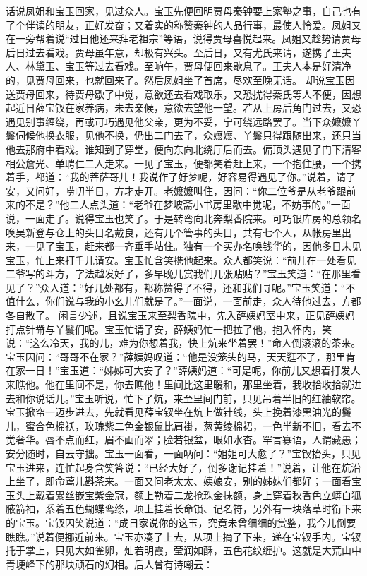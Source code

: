 \documentclass[12pt,oneside]{book}
\begin{document}
话说凤姐和宝玉回家，见过众人。宝玉先便回明贾母秦钟要上家塾之事，自己也有了个伴读的朋友，正好发奋；又着实的称赞秦钟的人品行事，最使人怜爱。凤姐又在一旁帮着说“过日他还来拜老祖宗”等语，说得贾母喜悦起来。凤姐又趁势请贾母后日过去看戏。贾母虽年意，却极有兴头。至后日，又有尤氏来请，遂携了王夫人、林黛玉、宝玉等过去看戏。至晌午，贾母便回来歇息了。王夫人本是好清净的，见贾母回来，也就回来了。然后凤姐坐了首席，尽欢至晚无话。
却说宝玉因送贾母回来，待贾母歇了中觉，意欲还去看戏取乐，又恐扰得秦氏等人不便，因想起近日薛宝钗在家养病，未去亲候，意欲去望他一望。若从上房后角门过去，又恐遇见别事缠绕，再或可巧遇见他父亲，更为不妥，宁可绕远路罢了。当下众嬷嬷丫鬟伺候他换衣服，见他不换，仍出二门去了，众嬷嬷、丫鬟只得跟随出来，还只当他去那府中看戏。谁知到了穿堂，便向东向北绕厅后而去。偏顶头遇见了门下清客相公詹光、单聘仁二人走来。一见了宝玉，便都笑着赶上来，一个抱住腰，一个携着手，都道：“我的菩萨哥儿！我说作了好梦呢，好容易得遇见了你。”说着，请了安，又问好，唠叨半日，方才走开。老嬷嬷叫住，因问：“你二位爷是从老爷跟前来的不是？”他二人点头道：“老爷在梦坡斋小书房里歇中觉呢，不妨事的。”一面说，一面走了。说得宝玉也笑了。于是转弯向北奔梨香院来。可巧银库房的总领名唤吴新登与仓上的头目名戴良，还有几个管事的头目，共有七个人，从帐房里出来，一见了宝玉，赶来都一齐垂手站住。独有一个买办名唤钱华的，因他多日未见宝玉，忙上来打千儿请安。宝玉忙含笑携他起来。众人都笑说：“前儿在一处看见二爷写的斗方，字法越发好了，多早晚儿赏我们几张贴贴？”宝玉笑道：“在那里看见了？”众人道：“好几处都有，都称赞得了不得，还和我们寻呢。”宝玉笑道：“不值什么，你们说与我的小幺儿们就是了。”一面说，一面前走，众人待他过去，方都各自散了。
闲言少述，且说宝玉来至梨香院中，先入薛姨妈室中来，正见薛姨妈打点针黹与丫鬟们呢。宝玉忙请了安，薛姨妈忙一把拉了他，抱入怀内，笑说：“这么冷天，我的儿，难为你想着我，快上炕来坐着罢！”命人倒滚滚的茶来。宝玉因问：“哥哥不在家？”薛姨妈叹道：“他是没笼头的马，天天逛不了，那里肯在家一日！”宝玉道：“姊姊可大安了？”薛姨妈道：“可是呢，你前儿又想着打发人来瞧他。他在里间不是，你去瞧他！里间比这里暖和，那里坐着，我收拾收拾就进去和你说话儿。”宝玉听说，忙下了炕，来至里间门前，只见吊着半旧的红紬软帘。宝玉掀帘一迈步进去，先就看见薛宝钗坐在炕上做针线，头上挽着漆黑油光的䰖儿，蜜合色棉袄，玫瑰紫二色金银鼠比肩褂，葱黄绫棉裙，一色半新不旧，看去不觉奢华。唇不点而红，眉不画而翠；脸若银盆，眼如水杏。罕言寡语，人谓藏愚；安分随时，自云守拙。宝玉一面看，一面吶问：“姐姐可大愈了？”宝钗抬头，只见宝玉进来，连忙起身含笑答说：“已经大好了，倒多谢记挂着！”说着，让他在炕沿上坐了，即命莺儿斟茶来。一面又问老太太、姨娘安，别的姊妹们都好；一面看宝玉头上戴着累丝嵌宝紫金冠，额上勒着二龙抢珠金抹额，身上穿着秋香色立蟒白狐腋箭袖，系着五色蝴蝶鸾绦，项上挂着长命锁、记名符，另外有一块落草时衔下来的宝玉。宝钗因笑说道：“成日家说你的这玉，究竟未曾细细的赏鉴，我今儿倒要瞧瞧。”说着便挪近前来。宝玉亦凑了上去，从项上摘了下来，递在宝钗手内。宝钗托于掌上，只见大如雀卵，灿若明霞，莹润如酥，五色花纹缠护。这就是大荒山中青埂峰下的那块顽石的幻相。后人曾有诗嘲云：
\end{document}

